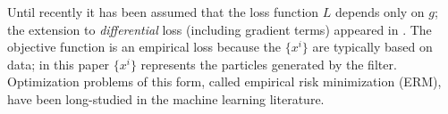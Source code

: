 Until recently it has been assumed that the loss function $L$ depends only on $g$;  the extension to \textit{differential} loss (including gradient terms) appeared in \cite{zho08}.    The objective function is an empirical loss  because the $\{x^i\}$ are typically based on data; in this paper $\{x^i\}$  represents the particles generated by the filter. Optimization problems of this form, called empirical risk minimization (ERM), have been long-studied in the machine learning literature.

%
%
%
